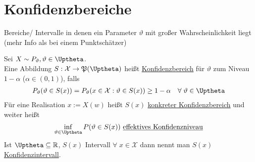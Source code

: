 \documentclass[a4paper,openany]{book}
\theoremstyle{mytheoremstyle}
\theoremstyle{mytheoremstyle2}
\begin{document}
\chapter{Konfidenzbereiche}
Bereiche/ Intervalle in denen ein Parameter $\vartheta $ mit großer Wahrscheinlichkeit liegt (mehr Info als bei einem Punktschätzer)
\begin{defi}{13.1}{}
  Sei $X\sim P _{\vartheta },\vartheta \in \Uptheta$. \\
  Eine Abbildung $S:\mathcal{X}\to \mathfrak{P}(\Uptheta)$ heißt \underline{Konfidenzbereich} für $\vartheta $ zum Niveau $1-\alpha $ ($\alpha \in (0,1)$), falls
  \begin{align*}
    P _{\vartheta }(\vartheta \in S(x) )=P _{\vartheta }(x \in \mathcal{X}:\vartheta \in S(x))\geq 1-\alpha\quad \forall\;\vartheta \in \Uptheta
  \end{align*}
  Für eine Realisation $x:=X(w)$ heißt $S(x)$ \underline{konkreter Konfidenzbereich} und weiter heißt 
  \begin{align*}
    \inf _{\vartheta \in \Uptheta}P(\vartheta \in S(x) )\text{ \underline{effektives Konfidenzniveau}}
  \end{align*}
  Ist $\Uptheta \subseteq \mathbb{R}$, $S(x)$ Intervall $\forall\;x \in \mathcal{X}$ dann nennt man $S(x)$ \underline{Konfidenzintervall}.
\end{defi}
\end{document}
